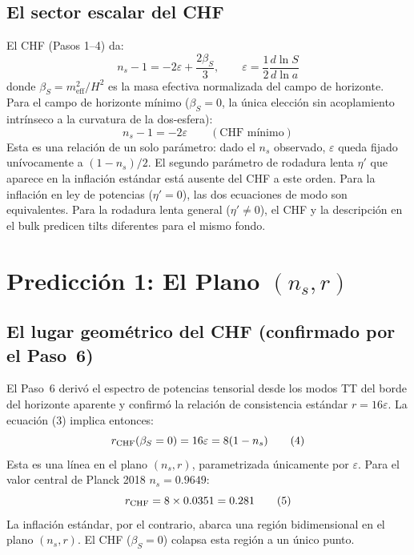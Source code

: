\documentclass[12pt,a4paper]{article}
\begin{document}
\subsection{El sector escalar del CHF}

El CHF (Pasos 1--4) da:
\begin{equation}
n_s - 1 = -2\varepsilon + \frac{2\beta_S}{3}, \qquad \varepsilon = \frac{1}{2}\frac{d\ln S}{d\ln a} \tag{2}
\end{equation}
donde $\beta_S = m_\text{eff}^2/H^2$ es la masa efectiva normalizada del campo de horizonte. Para el campo de horizonte mínimo ($\beta_S = 0$, la única elección sin acoplamiento intrínseco a la curvatura de la dos-esfera):
\begin{equation}
n_s - 1 = -2\varepsilon \qquad (\text{CHF mínimo}) \tag{3}
\end{equation}
Esta es una relación de un solo parámetro: dado el $n_s$ observado, $\varepsilon$ queda fijado unívocamente a $(1-n_s)/2$. El segundo parámetro de rodadura lenta $\eta'$ que aparece en la inflación estándar está ausente del CHF a este orden. Para la inflación en ley de potencias ($\eta' = 0$), las dos ecuaciones de modo son equivalentes. Para la rodadura lenta general ($\eta' \neq 0$), el CHF y la descripción en el bulk predicen tilts diferentes para el mismo fondo.

\section{Predicción 1: El Plano $(n_s, r)$}

\subsection{El lugar geométrico del CHF (confirmado por el Paso~6)}

El Paso~6 derivó el espectro de potencias tensorial desde los modos TT del borde del horizonte aparente y confirmó la relación de consistencia estándar $r = 16\varepsilon$. La ecuación (3) implica entonces:
\begin{equation}
r_{\rm CHF}(\beta_S = 0) = 16\varepsilon = 8(1 - n_s) \tag{4}
\end{equation}
Esta es una línea en el plano $(n_s, r)$, parametrizada únicamente por $\varepsilon$. Para el valor central de Planck 2018 $n_s = 0.9649$:
\begin{equation}
r_{\rm CHF} = 8 \times 0.0351 = 0.281 \tag{5}
\end{equation}
La inflación estándar, por el contrario, abarca una región bidimensional en el plano $(n_s, r)$. El CHF ($\beta_S=0$) colapsa esta región a un único punto.
\end{document}
